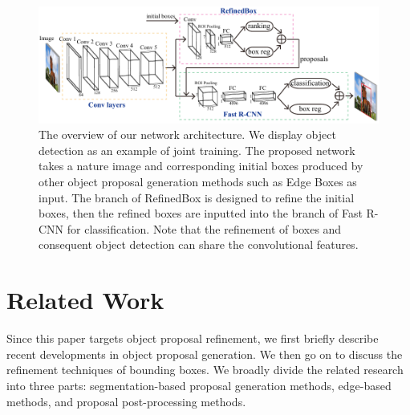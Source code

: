 \documentclass[10pt,twocolumn,letterpaper]{article}
\newcommand{\myPara}[1]{\vspace{.1in}\noindent\textbf{#1}}
\begin{document}
\begin{figure}[!ht]
	\centering
    \includegraphics[width=\linewidth]{network}
    \caption{The overview of our network architecture. We display object detection as 
    	an example of joint training. The proposed network takes a nature image and
        corresponding initial boxes produced by other object proposal generation 
        methods such as Edge Boxes as input. The branch of RefinedBox is
        designed to refine the initial boxes, then the refined boxes are inputted into
        the branch of Fast R-CNN for classification. Note that the refinement of boxes
        and consequent object detection can share the convolutional features.}
    \label{fig:network}
    \vspace{-0.15in}
\end{figure}


\section{Related Work}
%
Since this paper targets object proposal refinement, we first 
briefly describe recent developments in object proposal generation.
We then go on to discuss the refinement techniques of bounding boxes.
We broadly divide the related research into three parts: 
segmentation-based proposal generation methods, edge-based methods, 
and proposal post-processing methods.


\end{document}
